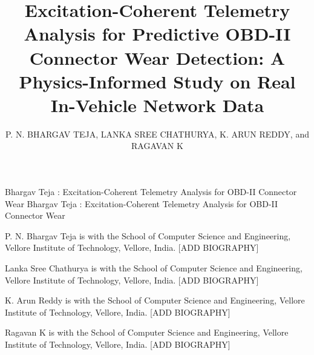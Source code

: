 \documentclass{ieeeaccess}
\begin{document}

\title{Excitation-Coherent Telemetry Analysis for Predictive OBD-II Connector Wear Detection: A Physics-Informed Study on Real In-Vehicle Network Data}

\author{\uppercase{P. N. Bhargav Teja},
\uppercase{Lanka Sree Chathurya},
\uppercase{K. Arun Reddy},
and \uppercase{Ragavan K}}
\address[1]{School of Computer Science and Engineering, Vellore Institute of Technology, Vellore, Tamil Nadu 632014, India}

\markboth
{Bhargav Teja \headeretal: Excitation-Coherent Telemetry Analysis for OBD-II Connector Wear}
{Bhargav Teja \headeretal: Excitation-Coherent Telemetry Analysis for OBD-II Connector Wear}




\titlepgskip=-15pt
\maketitle












\begin{IEEEbiography}{P. N. Bhargav Teja}
is with the School of Computer Science and Engineering, Vellore Institute of Technology, Vellore, India. [ADD BIOGRAPHY]
\end{IEEEbiography}

\begin{IEEEbiography}{Lanka Sree Chathurya}
is with the School of Computer Science and Engineering, Vellore Institute of Technology, Vellore, India. [ADD BIOGRAPHY]
\end{IEEEbiography}

\begin{IEEEbiography}{K. Arun Reddy}
is with the School of Computer Science and Engineering, Vellore Institute of Technology, Vellore, India. [ADD BIOGRAPHY]
\end{IEEEbiography}

\begin{IEEEbiography}{Ragavan K}
is with the School of Computer Science and Engineering, Vellore Institute of Technology, Vellore, India. [ADD BIOGRAPHY]
\end{IEEEbiography}

\EOD
\end{document}
